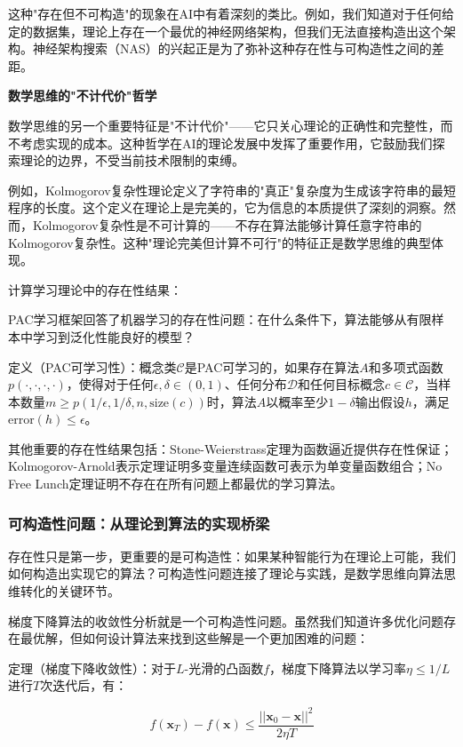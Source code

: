 这种"存在但不可构造"的现象在AI中有着深刻的类比。例如，我们知道对于任何给定的数据集，理论上存在一个最优的神经网络架构，但我们无法直接构造出这个架构。神经架构搜索（NAS）的兴起正是为了弥补这种存在性与可构造性之间的差距。

\textbf{数学思维的"不计代价"哲学}

数学思维的另一个重要特征是"不计代价"——它只关心理论的正确性和完整性，而不考虑实现的成本。这种哲学在AI的理论发展中发挥了重要作用，它鼓励我们探索理论的边界，不受当前技术限制的束缚。

例如，Kolmogorov复杂性理论定义了字符串的"真正"复杂度为生成该字符串的最短程序的长度。这个定义在理论上是完美的，它为信息的本质提供了深刻的洞察。然而，Kolmogorov复杂性是不可计算的——不存在算法能够计算任意字符串的Kolmogorov复杂性。这种"理论完美但计算不可行"的特征正是数学思维的典型体现。

计算学习理论中的存在性结果：

PAC学习框架回答了机器学习的存在性问题：在什么条件下，算法能够从有限样本中学习到泛化性能良好的模型？

定义（PAC可学习性）：概念类$\mathcal{C}$是PAC可学习的，如果存在算法$A$和多项式函数$p(\cdot, \cdot, \cdot, \cdot)$，使得对于任何$\epsilon, \delta \in (0,1)$、任何分布$\mathcal{D}$和任何目标概念$c \in \mathcal{C}$，当样本数量$m \geq p(1/\epsilon, 1/\delta, n, \text{size}(c))$时，算法$A$以概率至少$1-\delta$输出假设$h$，满足$\text{error}(h) \leq \epsilon$。

其他重要的存在性结果包括：Stone-Weierstrass定理为函数逼近提供存在性保证；Kolmogorov-Arnold表示定理证明多变量连续函数可表示为单变量函数组合；No Free Lunch定理证明不存在在所有问题上都最优的学习算法。

\subsubsection{可构造性问题：从理论到算法的实现桥梁}

存在性只是第一步，更重要的是可构造性：如果某种智能行为在理论上可能，我们如何构造出实现它的算法？可构造性问题连接了理论与实践，是数学思维向算法思维转化的关键环节。

梯度下降算法的收敛性分析就是一个可构造性问题。虽然我们知道许多优化问题存在最优解，但如何设计算法来找到这些解是一个更加困难的问题：

定理（梯度下降收敛性）：对于$L$-光滑的凸函数$f$，梯度下降算法以学习率$\eta \leq 1/L$进行$T$次迭代后，有：

$$f(\mathbf{x}_T) - f(\mathbf{x}) \leq \frac{||\mathbf{x}_0 - \mathbf{x}||^2}{2\eta T}$$

